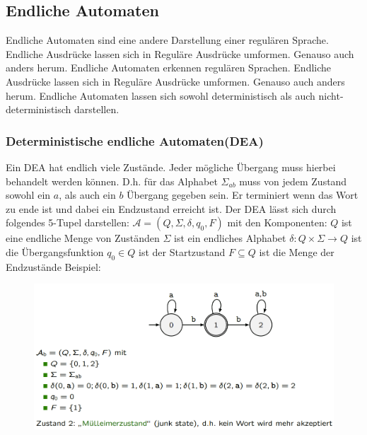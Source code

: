 \documentclass[12pt,a4paper]{article}
\begin{document}
	\subsection{Endliche Automaten}
	Endliche Automaten sind eine andere Darstellung einer regulären Sprache. Endliche Ausdrücke lassen sich in Reguläre Ausdrücke umformen. Genauso auch anders herum.\newline
	Endliche Automaten erkennen regulären Sprachen. Endliche Ausdrücke lassen sich in Reguläre Ausdrücke umformen. Genauso auch anders herum.\newline
	Endliche Automaten lassen sich sowohl deterministisch als auch nicht-deterministisch darstellen.

	\subsubsection{Deterministische endliche Automaten(DEA)}
	Ein DEA hat endlich viele Zustände. Jeder mögliche Übergang muss hierbei behandelt werden können. D.h. für das Alphabet $\varSigma_{ab}$ muss von jedem Zustand sowohl ein $a$, als auch ein $b$ Übergang gegeben sein. Er terminiert wenn das Wort zu ende ist und dabei ein Endzustand erreicht ist.\newline
	\noindent Der DEA lässt sich durch folgendes 5-Tupel darstellen:\newline
	$\mathcal{A} = (Q, \varSigma, \delta, q_0, F)$ mit den Komponenten:\newline
	$Q$ ist eine endliche Menge von Zuständen\newline
	$\varSigma$ ist ein endliches Alphabet\newline
	$\delta: Q \times \varSigma \rightarrow Q$ ist die Übergangsfunktion\newline
	$q_0 \in Q$ ist der Startzustand\newline
	$F \subseteq Q$ ist die Menge der Endzustände\newline
	\newline
	Beispiel:\newline
	\begin{center}
		\begin{figure}[!h]
			\includegraphics[width=\textwidth]{Bilder/DEA_Beispiel.PNG}
		\end{figure}
	\end{center}
\end{document}
